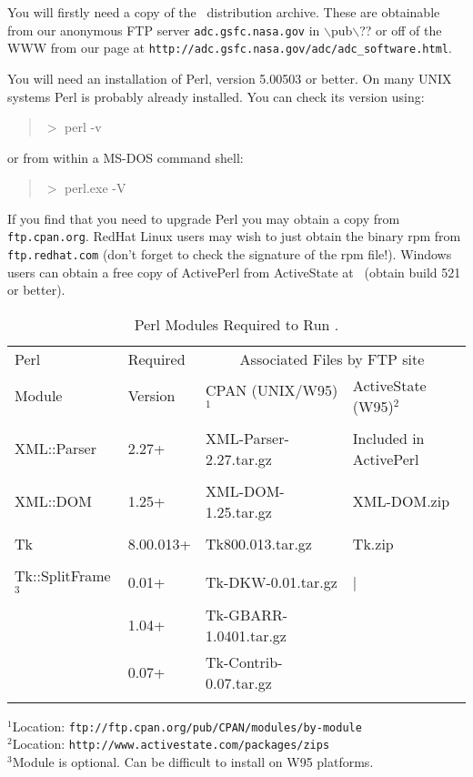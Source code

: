 You will firstly need a copy of the \program\ distribution archive.
These are obtainable from our anonymous FTP server 
{\tt adc.gsfc.nasa.gov} in $\backslash$pub$\backslash$?? or off of
the WWW from our page at {\tt http://adc.gsfc.nasa.gov/adc/adc\_software.html}. 

You will need an installation of Perl, version 5.00503 or better.
On many UNIX systems Perl is probably already installed. You can 
check its version using:
\begin{quote}
$>$ perl -v
\end{quote}
or from within a MS-DOS command shell:
\begin{quote}
$>$ perl.exe -V
\end{quote}
If you find that you need to upgrade Perl you may obtain a copy from 
{\tt ftp.cpan.org}. RedHat Linux users may wish to just obtain
the binary rpm from {\tt ftp.redhat.com} (don't forget to check the
signature of the rpm file!). Windows users can obtain
a free copy of ActivePerl from ActiveState at 
\activestatewebsite\
(obtain build 521 or better).  

\begin{table}
 \begin{center}
 \caption{Perl Modules Required to Run \program .}
 \label{tab:perl_modules}
  \vskip 12pt
  \begin{tabular}{|llll|} \hline
 Perl & Required & \multicolumn{2}{c|}{Associated Files by FTP site} \\
Module & Version & CPAN (UNIX/W95)$^{1}$ & ActiveState (W95)$^{2}$ \\ \hline\hline
 & & & \\
XML::Parser & 2.27+ & XML-Parser-2.27.tar.gz & Included in ActivePerl \\
 & & & \\
XML::DOM & 1.25+ & XML-DOM-1.25.tar.gz & XML-DOM.zip \\
 & & & \\
Tk & 8.00.013+ & Tk800.013.tar.gz & Tk.zip \\ 
 & & & \\
Tk::SplitFrame$^{3}$ & 0.01+  & Tk-DKW-0.01.tar.gz & | \\ 
 & 1.04+ & Tk-GBARR-1.0401.tar.gz & \\
 & 0.07+ & Tk-Contrib-0.07.tar.gz & \\
 & & & \\ \hline 
   \end{tabular}
  \end{center}
$^{1}$Location: {\tt ftp://ftp.cpan.org/pub/CPAN/modules/by-module} \\ 
$^{2}$Location: {\tt http://www.activestate.com/packages/zips} \\ 
$^{3}$Module is optional. Can be difficult to install on W95 platforms.
\end{table}


